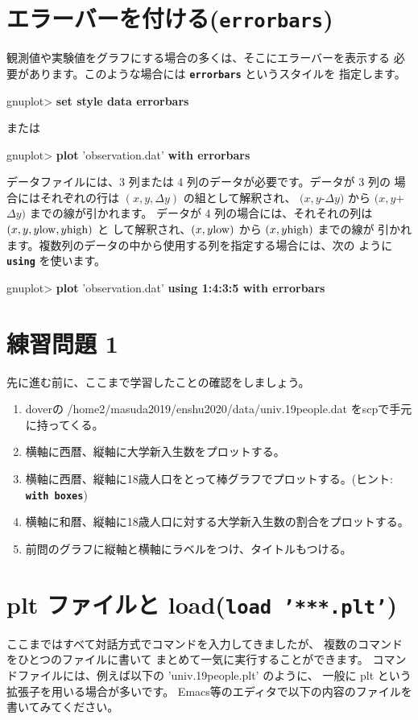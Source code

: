 \documentclass[a4j]{ujarticle} %
\newenvironment{terminal}{%
  \begin{center}
   \begin{minipage}{.8\textwidth}
    \setlength{\FrameSep}{.5\FrameSep}%
    \begin{framed}\ttfamily\small%
     \setlength\baselineskip{.85\baselineskip}%
}{%
    \end{framed}
   \end{minipage}
  \end{center}%
}
\begin{document}
\section{エラーバーを付ける({\tt\bf errorbars})}
観測値や実験値をグラフにする場合の多くは、そこにエラーバーを表示する
必要があります。このような場合には {\tt\bf errorbars} というスタイルを
指定します。
\begin{terminal}
gnuplot> {\bf set style data errorbars}
\end{terminal}
または
\begin{terminal}
gnuplot> {\bf plot} 'observation.dat' {\bf with errorbars}
\end{terminal}

データファイルには、3 列または 4 列のデータが必要です。データが 3 列の
場合にはそれぞれの行は $(x,y,\Delta y)$ の組として解釈され、
$(x,y$-$\Delta y)$ から $(x,y$+$\Delta y)$ までの線が引かれます。
データが 4 列の場合には、それそれの列は $(x,y,y{\rm low},y{\rm high})$ と
して解釈され、$(x,y{\rm low})$ から $(x,y{\rm high})$ までの線が
引かれます。複数列のデータの中から使用する列を指定する場合には、次の
ように {\tt\bf using} を使います。
\begin{terminal}
gnuplot> {\bf plot} 'observation.dat' {\bf using 1:4:3:5 with errorbars}
\end{terminal}
%

\section{練習問題 1}
先に進む前に、ここまで学習したことの確認をしましょう。
\begin{enumerate}
\item
     doverの /home2/masuda2019/enshu2020/data/univ.19people.dat をscpで手元に持ってくる。
\item
     横軸に西暦、縦軸に大学新入生数をプロットする。
\item
     横軸に西暦、縦軸に18歳人口をとって棒グラフでプロットする。(ヒント:{\tt\bf
     with boxes})
\item
     横軸に和暦、縦軸に18歳人口に対する大学新入生数の割合をプロットする。
\item
     前問のグラフに縦軸と横軸にラベルをつけ、タイトルもつける。\\
\end{enumerate}

\section{plt ファイルと load({\tt\bf load '***.plt'})}
ここまではすべて対話方式でコマンドを入力してきましたが、
複数のコマンドをひとつのファイルに書いて
まとめて一気に実行することができます。
コマンドファイルには、例えば以下の 'univ.19people.plt' のように、
一般に plt という拡張子を用いる場合が多いです。
Emacs等のエディタで以下の内容のファイルを書いてみてください。
\end{document}
